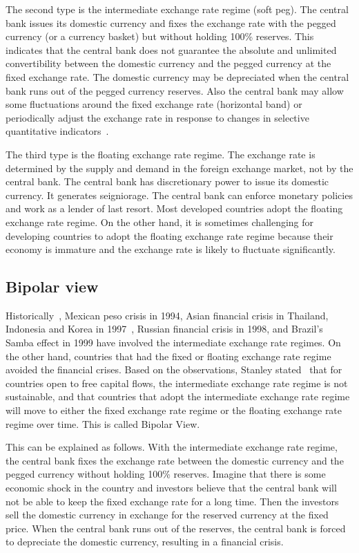 \documentclass[dvipdfmx,a4paper]{article}
\begin{document}
The second type is the intermediate exchange rate regime (soft peg). The central bank issues its domestic currency and fixes the exchange rate with the pegged currency (or a currency basket) but without holding 100\% reserves. This indicates that the central bank does not guarantee the absolute and unlimited convertibility between the domestic currency and the pegged currency at the fixed exchange rate. The domestic currency may be depreciated when the central bank runs out of the pegged currency reserves. Also the central bank may allow some fluctuations around the fixed exchange rate (horizontal band) or periodically adjust the exchange rate in response to changes in selective quantitative indicators~\cite{imfreport}.

The third type is the floating exchange rate regime. The exchange rate is determined by the supply and demand in the foreign exchange market, not by the central bank. The central bank has discretionary power to issue its domestic currency. It generates seigniorage. The central bank can enforce monetary policies and work as a lender of last resort. Most developed countries adopt the floating exchange rate regime. On the other hand, it is sometimes challenging for developing countries to adopt the floating exchange rate regime because their economy is immature and the exchange rate is likely to fluctuate significantly.

\subsection{Bipolar view}

Historically~\cite{fischer2001exchange}, Mexican peso crisis in 1994, Asian financial crisis in Thailand, Indonesia and Korea in 1997~\cite{radelet1998east}, Russian financial crisis in 1998, and Brazil's Samba effect in 1999 have involved the intermediate exchange rate regimes. On the other hand, countries that had the fixed or floating exchange rate regime avoided the financial crises. Based on the observations, Stanley stated~\cite{fischer2001exchange} that for countries open to free capital flows, the intermediate exchange rate regime is not sustainable, and that countries that adopt the intermediate exchange rate regime will move to either the fixed exchange rate regime or the floating exchange rate regime over time. This is called Bipolar View.

This can be explained as follows. With the intermediate exchange rate regime, the central bank fixes the exchange rate between the domestic currency and the pegged currency without holding 100\% reserves. Imagine that there is some economic shock in the country and investors believe that the central bank will not be able to keep the fixed exchange rate for a long time. Then the investors sell the domestic currency in exchange for the reserved currency at the fixed price. When the central bank runs out of the reserves, the central bank is forced to depreciate the domestic currency, resulting in a financial crisis.
\end{document}
